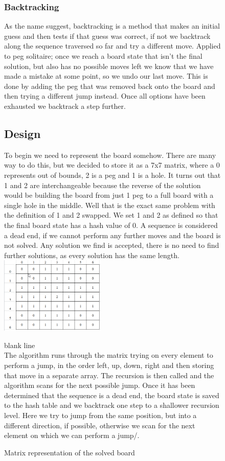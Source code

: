 \documentclass[11pt]{article}
\begin{document}
\begin{figure}

\subsubsection*{Backtracking}
As the name suggest, backtracking is a method that makes an initial guess and then tests if that guess was correct, if not we backtrack along the sequence traversed so far and try a different move. 
Applied to peg solitaire; once we reach a board state that isn't the final solution, but also has no possible moves left we know that we have made a mistake at some point, so we undo our last move. This is done by adding the peg that was removed back onto the board and then trying a different jump instead. Once all options have been exhausted we backtrack a step further.
\subsection{Design}
To begin we need to represent the board somehow. There are many way to do this, but we decided to store it as a 7x7 matrix, where a 0 represents out of bounds, 2 is a peg and 1 is a hole. It turns out that 1 and 2 are interchangeable because the reverse of the solution would be building the board from just 1 peg to a full board with a single hole in the middle. Well that is the exact same problem with the definition of 1 and 2 swapped. We set 1 and 2 as defined so that the final board state has a hash value of 0.
A sequence is considered a dead end, if we cannot perform any further moves and the board is not solved. Any solution we find is accepted, there is no need to find further solutions, as every solution has the same length.\\\newline
\includegraphics[width=5cm]{2}
\caption{Matrix representation of the solved board} 
\label{fig:2}
\color{white} blank line\\
\color{black}
The algorithm runs through the matrix trying on every element to perform a jump, in the order left, up, down, right and then storing that move in a separate array. The recursion is then called and the algorithm scans for the next possible jump. Once it has been determined that the sequence is a dead end, the board state is saved to the hash table and we backtrack one step to a shallower recursion level. Here we try to jump from the same position, but into a different direction, if possible, otherwise we scan for the next element on which we can perform a jump/.
\end{figure}
\end{document}
